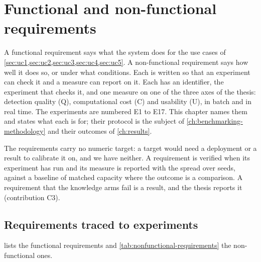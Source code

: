 \section{Functional and non-functional requirements}
\label{sec:requirements}

A functional requirement says what the system does for the use cases of
\cref{sec:uc1,sec:uc2,sec:uc3,sec:uc4,sec:uc5}. A non-functional requirement says
how well it does so, or under what conditions. Each is written so that an
experiment can check it and a measure can report on it. Each has an identifier,
the experiment that checks it, and one measure on one of the three axes of the
thesis: detection quality (Q), computational cost (C) and usability (U), in batch
and in real time. The experiments are numbered E1 to
E17. This chapter names them and states what each is for; their protocol is the
subject of \cref{ch:benchmarking-methodology} and their outcomes of
\cref{ch:results}.

The requirements carry no numeric target: a target would need a deployment or a
result to calibrate it on, and we have neither. A requirement is verified when its
experiment has run and its measure is reported with the spread over seeds, against a
baseline of matched capacity where the outcome is a comparison. A requirement that
the knowledge arms fail is a result, and the thesis reports it (contribution C3).

\subsection{Requirements traced to experiments}
\label{sec:requirement-table}

 lists the functional requirements and
\cref{tab:nonfunctional-requirements} the non-functional ones.

